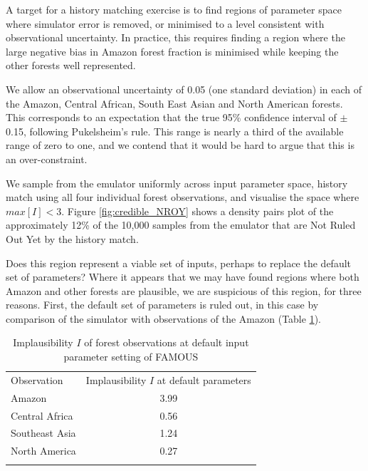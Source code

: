 \documentclass[esd, article]{copernicus} %
\begin{document}


A target for a history matching exercise is to find regions of parameter space where simulator error is removed, or minimised to a level consistent with observational uncertainty. In practice, this requires finding a region where the large negative bias in Amazon forest fraction is minimised while keeping the other forests well represented.

We allow an observational uncertainty of 0.05 (one standard deviation) in each of the Amazon, Central African, South East Asian and North American forests. This corresponds to an expectation that the true 95\% confidence interval of $\pm$0.15, following Pukelsheim's rule. This range is nearly a third of the available range of zero to one, and we contend that it would be hard to argue that this is an over-constraint.

We sample from the emulator uniformly across input parameter space, history match using all four individual forest observations, and visualise the space where $max[I] < 3$. Figure \ref{fig:credible_NROY} shows a density pairs plot of the approximately 12\% of the 10,000 samples from the emulator that are Not Ruled Out Yet by the history match.


Does this region represent a viable set of inputs, perhaps to replace the default set of parameters? Where it appears that we may have found regions where both Amazon and other forests are plausible, we are suspicious of this region, for three reasons. First, the default set of parameters is ruled out, in this case by comparison of the simulator with observations of the Amazon (Table \ref{tab:default_parameter_implausibility}).


\begin{table}[t]
\caption{Implausibility $I$ of forest observations at default input parameter setting of FAMOUS}\label{tab:default_parameter_implausibility}
\begin{tabular}{lc}

\tophline
Observation &  Implausibility $I$ at default parameters \\
Amazon & 3.99 \\
Central Africa & 0.56 \\
Southeast Asia & 1.24 \\
North America & 0.27 \\
\bottomhline
\end{tabular}
\belowtable{} %
\end{table}
\end{document}
